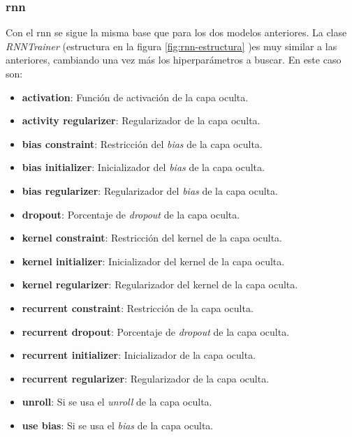 \subsubsection{\gls{rnn}}

Con el \gls{rnn} se sigue la misma base que para los dos modelos anteriores. La clase \textit{RNNTrainer} (estructura en la figura \ref{fig:rnn-estructura} )es muy similar a las anteriores, cambiando una vez más los hiperparámetros a buscar. En este caso son:

\begin{itemize}
    \item \textbf{activation}: Función de activación de la capa oculta.
    \item \textbf{activity regularizer}: Regularizador de la capa oculta.
    \item \textbf{bias constraint}: Restricción del \textit{bias} de la capa oculta.
    \item \textbf{bias initializer}: Inicializador del \textit{bias} de la capa oculta.
    \item \textbf{bias regularizer}: Regularizador del \textit{bias} de la capa oculta.
    \item \textbf{dropout}: Porcentaje de \textit{dropout} de la capa oculta.
    \item \textbf{kernel constraint}: Restricción del kernel de la capa oculta.
    \item \textbf{kernel initializer}: Inicializador del kernel de la capa oculta.
    \item \textbf{kernel regularizer}: Regularizador del kernel de la capa oculta.
    \item \textbf{recurrent constraint}: Restricción de la capa oculta.
    \item \textbf{recurrent dropout}: Porcentaje de \textit{dropout} de la capa oculta.
    \item \textbf{recurrent initializer}: Inicializador de la capa oculta.
    \item \textbf{recurrent regularizer}: Regularizador de la capa oculta.
    \item \textbf{unroll}: Si se usa el \textit{unroll} de la capa oculta.
    \item \textbf{use bias}: Si se usa el \textit{bias} de la capa oculta.
\end{itemize}

